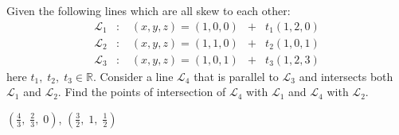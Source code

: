 
\begin{Exercise}[
name={},
title={}, 
difficulty=0,
origin={\cite{YL}}]
Given the following lines which are all skew to each other:
\[
\begin{array}{lllllllll}
\mathcal{L}_1 & : & \; (x, y, z)=(1, 0, 0) & + & t_1(1, 2, 0)\\
\mathcal{L}_2 & : & \; (x, y, z)=(1, 1, 0) & + & t_2(1, 0, 1)\\
\mathcal{L}_3 & : & \; (x, y, z)=(1, 0, 1) & + & t_3(1, 2, 3)
\end{array}
\]
here $t_1,\;t_2,\;t_3\in\mathbb{R}$. Consider a line $\mathcal{L}_4$ that is parallel
to $\mathcal{L}_3$ and intersects both $\mathcal{L}_1$ and $\mathcal{L}_2$.  Find the
points of intersection of $\mathcal{L}_4$ with $\mathcal{L}_1$ and $\mathcal{L}_4$ with
$\mathcal{L}_2$.
\end{Exercise}
\begin{Answer}
$\left(\frac{4}{3},\;\frac{2}{3},\;0\right)$, $\left(\frac{3}{2},\;1,\;\frac{1}{2}\right)$
\end{Answer}
